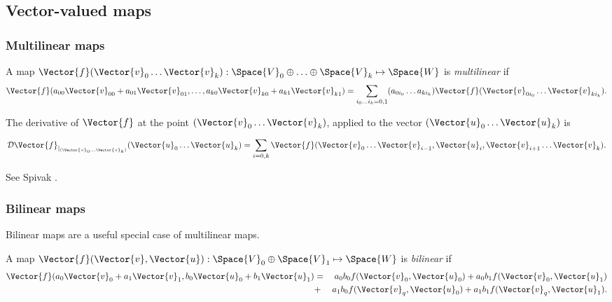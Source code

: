 
\subsection{Vector-valued maps}


\subsubsection{Multilinear maps}
\label{sec:Multilinear-maps}

A map $\Vector{f}(\Vector{v}_0 \ldots \Vector{v}_k):\Space{V}_0 \oplus \ldots \oplus \Space{V}_k \mapsto \Space{W}$
is {\it multilinear} if
\begin{equation}
\Vector{f}(a_{00} \Vector{v}_{00} + a_{01} \Vector{v}_{01}, \ldots, a_{k0} \Vector{v}_{k0} + a_{k1} \Vector{v}_{k1})
 =  \sum_{i_0 \ldots i_k = 0,1} (a_{0i_0} \ldots a_{ki_k}) \Vector{f}(\Vector{v}_{0i_0} \ldots \Vector{v}_{ki_k}).
\end{equation}

The derivative of $\Vector{f}$
at the point $(\Vector{v}_0 \ldots \Vector{v}_k)$, applied to the vector $(\Vector{u}_0 \ldots \Vector{u}_k)$ is

\begin{equation}
\Dc{\Vector{f}}{(\Vector{v}_0 \ldots \Vector{v}_k)}{\Vector{u}_0 \ldots \Vector{u}_k}
 =  \sum_{i=0,k} \Vector{f}(\Vector{v}_0 \ldots \Vector{v}_{i-1},\Vector{u}_i,\Vector{v}_{i+1} \ldots \Vector{v}_k).
\end{equation}

See Spivak \cite[ex.~2-14]{Spivak:1965:CalculusOnManifolds}.



\subsubsection{Bilinear maps}
\label{sec:Bilinear-maps}

Bilinear maps are a useful special case of multilinear maps.

A map $\Vector{f}(\Vector{v},\Vector{u}):\Space{V}_0 \oplus \Space{V}_1 \mapsto \Space{W}$
is {\it bilinear} if
\begin{eqnarray}
\Vector{f}(a_0 \Vector{v}_0 + a_1 \Vector{v}_1, b_0 \Vector{u}_0 + b_1 \Vector{u}_1)
& =  & a_0 b_0 f(\Vector{v}_0,\Vector{u}_0)
+  a_0 b_1 f(\Vector{v}_0,\Vector{u}_1)
\\
& +  & a_1 b_0 f(\Vector{v}_q,\Vector{u}_0)
 +  a_1 b_1 f(\Vector{v}_q,\Vector{u}_1).
\nonumber
\end{eqnarray}

